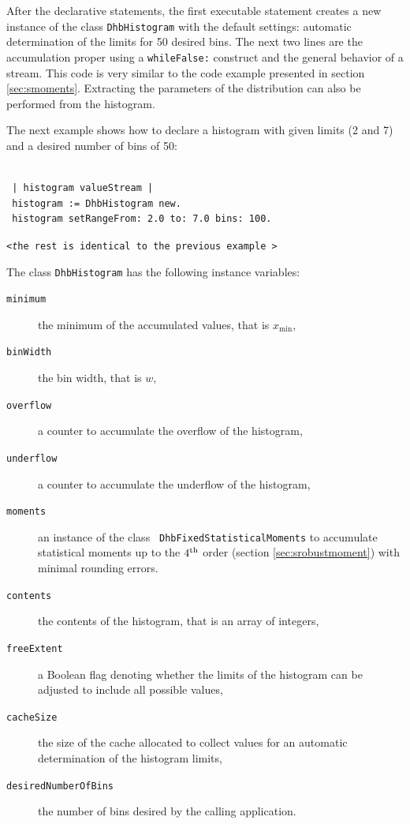 After the declarative statements, the first executable statement
creates a new instance of the class {\tt DhbHistogram} with the
default settings: automatic determination of the limits for 50
desired bins. The next two lines are the accumulation proper using
a {\tt whileFalse:} construct and the general behavior of a
stream. This code is very similar to the code example presented in
section \ref{sec:smoments}. Extracting the parameters of the
distribution can also be performed from the histogram.

\noindent The next example shows how to declare a histogram with
given limits (2 and 7) and a desired number of bins of 50:
\begin{codeExample}
\begin{verbatim}

 | histogram valueStream |
 histogram := DhbHistogram new.
 histogram setRangeFrom: 2.0 to: 7.0 bins: 100.
\end{verbatim}
\hfil {\tt<\textsl the rest is identical to the previous example\tt
>}\hfil
\end{codeExample}

\noindent The class {\tt DhbHistogram} has the following instance
variables:
\begin{description}
  \item[\tt minimum] the minimum of the accumulated values, that
  is $x_{\min}$,
  \item[\tt binWidth] the bin width, that is $w$,
  \item[\tt overflow] a counter to accumulate the overflow of the histogram,
  \item[\tt underflow] a counter to accumulate the underflow of the histogram,
  \item[\tt moments] an instance of the class {\tt
  DhbFixedStatisticalMoments} to accumulate statistical moments up
  to the $4^{\mathop{\textrm{th}}}$ order (\cf section \ref{sec:srobustmoment}) with
  minimal rounding errors.
  \item[\tt contents] the contents of the histogram, that is an
  array of integers,
  \item[\tt freeExtent] a Boolean flag denoting whether the limits
  of the histogram can be adjusted to include all possible values,
  \item[\tt cacheSize] the size of the cache allocated to collect
  values for an automatic determination of the histogram limits,
  \item[\tt desiredNumberOfBins] the number of bins desired by the
  calling application.
\end{description}

